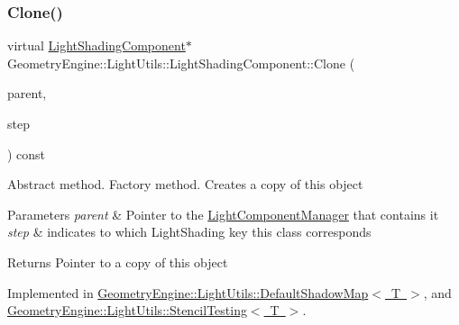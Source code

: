 \mbox{\label{class_geometry_engine_1_1_light_utils_1_1_light_shading_component_a8f2107f451b130b6f4e7042cafbc8210}} 
\subsubsection{\texorpdfstring{Clone()}{Clone()}}
{\footnotesize\ttfamily virtual \mbox{\hyperlink{class_geometry_engine_1_1_light_utils_1_1_light_shading_component}{Light\+Shading\+Component}}$\ast$ Geometry\+Engine\+::\+Light\+Utils\+::\+Light\+Shading\+Component\+::\+Clone (\begin{DoxyParamCaption}\item[{\mbox{\hyperlink{class_geometry_engine_1_1_light_utils_1_1_light_component_manager}{Light\+Component\+Manager}} $\ast$}]{parent,  }\item[{\mbox{\hyperlink{namespace_geometry_engine_1_1_light_utils_a16eb370137c2fd151e6f8e1d07cd23e0}{Light\+Shading}}}]{step }\end{DoxyParamCaption}) const\hspace{0.3cm}{\ttfamily [pure virtual]}}

Abstract method. Factory method. Creates a copy of this object 
\begin{DoxyParams}{Parameters}
{\em parent} & Pointer to the \mbox{\hyperlink{class_geometry_engine_1_1_light_utils_1_1_light_component_manager}{Light\+Component\+Manager}} that contains it \\
\hline
{\em step} & indicates to which Light\+Shading key this class corresponds \\
\hline
\end{DoxyParams}
\begin{DoxyReturn}{Returns}
Pointer to a copy of this object 
\end{DoxyReturn}


Implemented in \mbox{\hyperlink{class_geometry_engine_1_1_light_utils_1_1_default_shadow_map_aa13953acd90de9f9567cee0951c64684}{Geometry\+Engine\+::\+Light\+Utils\+::\+Default\+Shadow\+Map$<$ T $>$}}, and \mbox{\hyperlink{class_geometry_engine_1_1_light_utils_1_1_stencil_testing_a213b9b0be58d6f4481465abfbcc15cfb}{Geometry\+Engine\+::\+Light\+Utils\+::\+Stencil\+Testing$<$ T $>$}}.

